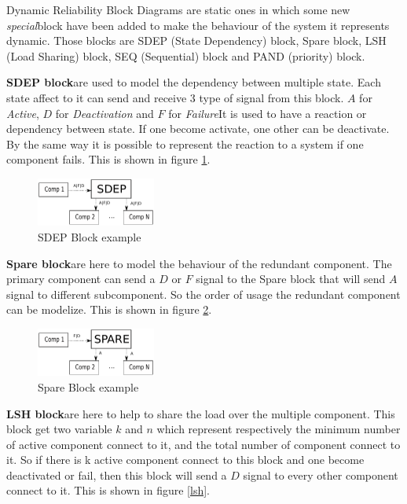 Dynamic Reliability Block Diagrams are static ones in which some new
\emph{special}block have been added to make the behaviour of the system it
represents dynamic. Those blocks are SDEP (State Dependency) block,
Spare block, LSH (Load Sharing) block, SEQ (Sequential) block and PAND
(priority) block. \newline

\textbf{SDEP block}are used to model the dependency between multiple
state. Each state affect to it can send and receive 3 type of signal
from this block. $A$ for \emph{Active}, $D$ for \emph{Deactivation} and $F$ for
\emph{Failure}It is used to have a reaction or dependency between
state. If one become activate, one other can be deactivate. By the
same way it is possible to represent the reaction to a system if one
component fails. This is shown in figure \ref{sdep}.

\begin{figure}[h]
    \centering
	\includegraphics[width=0.35\textwidth]{schema/sdep.pdf}
    \caption{SDEP Block example}
    \label{sdep}
\end{figure}


\textbf{Spare block}are here to model the behaviour of the redundant
component. The primary component can send a $D$ or $F$ signal to the
Spare block that will send $A$ signal to different subcomponent. So
the order of usage the redundant component can be modelize. This is
shown in figure \ref{spare}.

\begin{figure}[h]
    \centering
	\includegraphics[width=0.35\textwidth]{schema/spare.pdf}
    \caption{Spare Block example}
    \label{spare}
\end{figure}


\textbf{LSH block}are here to help to share the load over the multiple
component. This block get two variable $k$ and $n$ which represent
respectively the minimum number of active component connect to it, and
the total number of component connect to it. So if there is k active
component connect to this block and one become deactivated or fail,
then this block will send a $D$ signal to every other component
connect to it. This is shown in figure \ref{lsh}.

